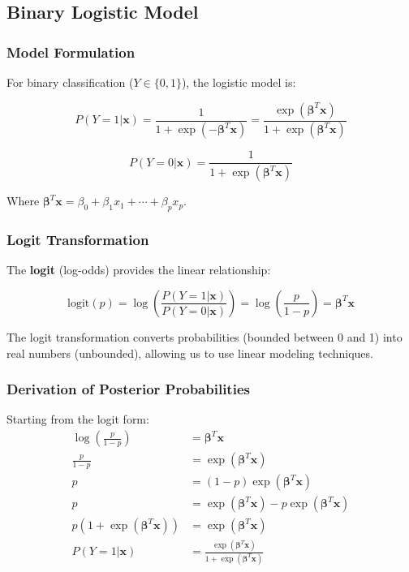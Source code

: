 \documentclass[12pt,a4paper]{article}
\begin{document}
\subsection{Binary Logistic Model}

\subsubsection{Model Formulation}

For binary classification ($Y \in \{0,1\}$), the logistic model is:

\begin{equation}
P(Y = 1 | \mathbf{x}) = \frac{1}{1 + \exp(-\boldsymbol{\beta}^T\mathbf{x})} = \frac{\exp(\boldsymbol{\beta}^T\mathbf{x})}{1 + \exp(\boldsymbol{\beta}^T\mathbf{x})}
\end{equation}

\begin{equation}
P(Y = 0 | \mathbf{x}) = \frac{1}{1 + \exp(\boldsymbol{\beta}^T\mathbf{x})}
\end{equation}

Where $\boldsymbol{\beta}^T\mathbf{x} = \beta_0 + \beta_1 x_1 + \cdots + \beta_p x_p$.

\subsubsection{Logit Transformation}

The \textbf{logit} (log-odds) provides the linear relationship:

\begin{equation}
\text{logit}(p) = \log\left(\frac{P(Y=1|\mathbf{x})}{P(Y=0|\mathbf{x})}\right) = \log\left(\frac{p}{1-p}\right) = \boldsymbol{\beta}^T\mathbf{x}
\end{equation}

\begin{tcolorbox}[colback=green!5!white,colframe=green!75!black,title=Interpretation]
The logit transformation converts probabilities (bounded between 0 and 1) into real numbers (unbounded), allowing us to use linear modeling techniques.
\end{tcolorbox}

\subsubsection{Derivation of Posterior Probabilities}

Starting from the logit form:
\begin{align}
\log\left(\frac{p}{1-p}\right) &= \boldsymbol{\beta}^T\mathbf{x} \\
\frac{p}{1-p} &= \exp(\boldsymbol{\beta}^T\mathbf{x}) \\
p &= (1-p) \exp(\boldsymbol{\beta}^T\mathbf{x}) \\
p &= \exp(\boldsymbol{\beta}^T\mathbf{x}) - p \exp(\boldsymbol{\beta}^T\mathbf{x}) \\
p(1 + \exp(\boldsymbol{\beta}^T\mathbf{x})) &= \exp(\boldsymbol{\beta}^T\mathbf{x}) \\
P(Y=1|\mathbf{x}) &= \frac{\exp(\boldsymbol{\beta}^T\mathbf{x})}{1 + \exp(\boldsymbol{\beta}^T\mathbf{x})}
\end{align}
\end{document}
